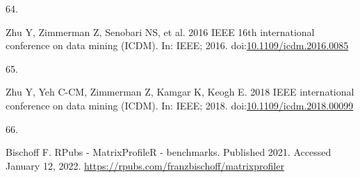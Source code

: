 \documentclass[12pt,twoside]{fmupthesis}
\newlength{\csllabelwidth}
\newlength{\cslhangindent}
\newenvironment{CSLReferences}[2] %
 {%
  \setlength{\parindent}{0pt}
  \ifodd #1 \everypar{\setlength{\hangindent}{\cslhangindent}}\ignorespaces\fi
  \ifnum #2 > 0
  \setlength{\parskip}{#2\baselineskip}
  \fi
 }%
 {}
\newcommand{\CSLLeftMargin}[1]{\parbox[t]{\csllabelwidth}{#1}}
\newcommand{\CSLRightInline}[1]{\parbox[t]{\linewidth - \csllabelwidth}{#1}}
\begin{document}
\begin{CSLReferences}{0}{0}
\leavevmode{}%
\CSLLeftMargin{64. }
\CSLRightInline{Zhu Y, Zimmerman Z, Senobari NS, et al. 2016 IEEE 16th international conference on data mining (ICDM). In: IEEE; 2016. doi:\href{https://doi.org/10.1109/icdm.2016.0085}{10.1109/icdm.2016.0085}}

\leavevmode{}%
\CSLLeftMargin{65. }
\CSLRightInline{Zhu Y, Yeh C-CM, Zimmerman Z, Kamgar K, Keogh E. 2018 IEEE international conference on data mining (ICDM). In: IEEE; 2018. doi:\href{https://doi.org/10.1109/icdm.2018.00099}{10.1109/icdm.2018.00099}}

\leavevmode{}%
\CSLLeftMargin{66. }
\CSLRightInline{Bischoff F. RPubs - MatrixProfileR - benchmarks. Published 2021. Accessed January 12, 2022. \url{https://rpubs.com/franzbischoff/matrixprofiler}}

\end{CSLReferences}

\end{document}
